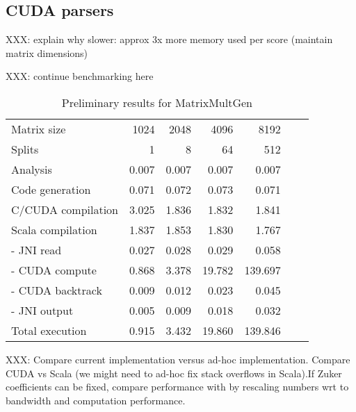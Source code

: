 \documentclass[11pt]{article}
\begin{document}
\subsection{CUDA parsers}
{\color{red} XXX: explain why slower: approx 3x more memory used per score (maintain matrix dimensions)

XXX: continue benchmarking here
}
\begin{table}[H]\begin{center}\begin{tabular}{lrrrrrr} \toprule
Matrix size			& 1024	& 2048	& 4096	& 8192 \\
Splits				& 1		& 8		& 64		& 512 \\ \midrule
Analysis				& 0.007	& 0.007	& 0.007	& 0.007 \\
Code generation		& 0.071	& 0.072	& 0.073	& 0.071 \\
C/CUDA compilation	& 3.025	& 1.836	& 1.832	& 1.841 \\
Scala compilation		& 1.837	& 1.853	& 1.830	& 1.767 \\ \midrule
- JNI read				& 0.027	& 0.028	& 0.029	& 0.058 \\
- CUDA compute		& 0.868	& 3.378	& 19.782	& 139.697 \\
- CUDA backtrack		& 0.009	& 0.012	& 0.023	& 0.045 \\
- JNI output			& 0.005	& 0.009	& 0.018	& 0.032 \\
Total execution			& 0.915	& 3.432	& 19.860	& 139.846 \\ \bottomrule
\end{tabular}\end{center}\caption{Preliminary results for MatrixMultGen}\end{table}

{\color{red} XXX: Compare current implementation versus ad-hoc implementation. Compare CUDA vs Scala (we might need to ad-hoc fix stack overflows in Scala).If Zuker coefficients can be fixed, compare performance with \cite{adp_gpu} by rescaling numbers wrt to bandwidth and computation performance.}
\end{document}
